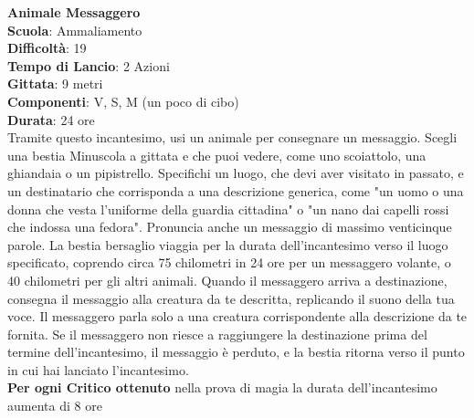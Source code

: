 \begin{multicols}{2}
\medskip\textbf{Animale Messaggero}\\
\textbf{Scuola}: Ammaliamento\\
\textbf{Difficoltà}: 19\\
\textbf{Tempo di Lancio}: 2 Azioni\\
\textbf{Gittata}: 9 metri\\
\textbf{Componenti}: V, S, M (un poco di cibo)\\
\textbf{Durata}: 24 ore\\
Tramite questo incantesimo, usi un animale per consegnare un messaggio. Scegli una bestia Minuscola a gittata e che puoi vedere, come uno scoiattolo, una ghiandaia o un pipistrello. Specifichi un luogo, che devi aver visitato in passato, e un destinatario che corrisponda a una descrizione generica, come "un uomo o una donna che vesta l'uniforme della guardia cittadina" o "un nano dai capelli rossi che indossa una fedora". Pronuncia anche un messaggio di massimo venticinque parole. La bestia bersaglio viaggia per la durata dell'incantesimo verso il luogo specificato, coprendo circa 75 chilometri in 24 ore per un messaggero volante, o 40 chilometri per gli altri animali. Quando il messaggero arriva a destinazione, consegna il messaggio alla creatura da te descritta, replicando il suono della tua voce. Il messaggero parla solo a una creatura corrispondente alla descrizione da te fornita. Se il messaggero non riesce a raggiungere la destinazione prima del termine dell'incantesimo, il messaggio è perduto, e la bestia ritorna verso il punto in cui hai lanciato l'incantesimo.\\
\textbf{Per ogni Critico ottenuto} nella prova di magia la durata dell'incantesimo aumenta di 8 ore


\end{multicols}
